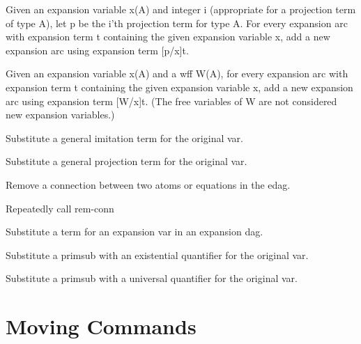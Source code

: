 \begin{description}
\item[EXPAND-PROJECT]  
Given an expansion variable x(A) and integer i (appropriate
for a projection term of type A), let p be the i'th projection term
for type A.  For every expansion arc with expansion term t containing
the given expansion variable x, add a new expansion arc using
expansion term [p/x]t.

\item[EXPAND-SUBST]  
Given an expansion variable x(A) and a wff W(A), for every
expansion arc with expansion term t containing the given expansion
variable x, add a new expansion arc using expansion term [W/x]t.  (The
free variables of W are not considered new expansion variables.)

\item[IMITATE]  
Substitute a general imitation term for the original var.

\item[PROJECT]  
Substitute a general projection term for the original var.

\item[REM-CONN]  
Remove a connection between two atoms or equations in the edag.

\item[REM-CONN*]  
Repeatedly call rem-conn

\item[SUBST]  
Substitute a term for an expansion var in an expansion dag.

\item[SUBST-EXISTS]  
Substitute a primsub with an existential quantifier for the original var.

\item[SUBST-FORALL]  
Substitute a primsub with a universal quantifier for the original var.
\item
\end{description}

\section{Moving Commands}

